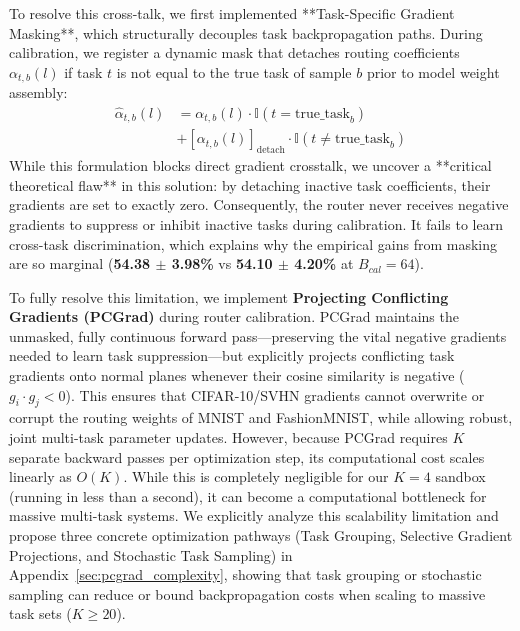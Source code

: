 To resolve this cross-talk, we first implemented **Task-Specific Gradient Masking**, which
structurally decouples task backpropagation paths. During calibration, we register a dynamic mask
that detaches routing coefficients $\alpha_{t, b}(l)$ if task $t$ is not equal to the true task of
sample $b$ prior to model weight assembly:
\begin{align}
\hat{\alpha}_{t, b}(l) &= \alpha_{t, b}(l) \cdot \mathbb{I}(t = \text{true\_task}_b) \nonumber \\
&+ \left[\alpha_{t, b}(l)\right]_{\text{detach}} \cdot \mathbb{I}(t \neq \text{true\_task}_b)
\label{eq:grad_mask_eq}
\end{align}
While this formulation blocks direct gradient crosstalk, we uncover a **critical theoretical flaw**
in this solution: by detaching inactive task coefficients, their gradients are set to exactly zero.
Consequently, the router never receives negative gradients to suppress or inhibit inactive tasks
during calibration. It fails to learn cross-task discrimination, which explains why the empirical
gains from masking are so marginal (\textbf{54.38 $\pm$ 3.98\%} vs \textbf{54.10 $\pm$ 4.20\%} at
$B_{cal}=64$).

To fully resolve this limitation, we implement \textbf{Projecting Conflicting Gradients (PCGrad)}
during router calibration. PCGrad maintains the unmasked, fully continuous forward pass---preserving
the vital negative gradients needed to learn task suppression---but explicitly projects conflicting
task gradients onto normal planes whenever their cosine similarity is negative ($g_i \cdot g_j <
0$). This ensures that CIFAR-10/SVHN gradients cannot overwrite or corrupt the routing weights of
MNIST and FashionMNIST, while allowing robust, joint multi-task parameter updates. However, because
PCGrad requires $K$ separate backward passes per optimization step, its computational cost scales
linearly as $O(K)$. While this is completely negligible for our $K=4$ sandbox (running in less than
a second), it can become a computational bottleneck for massive multi-task systems. We explicitly
analyze this scalability limitation and propose three concrete optimization pathways (Task Grouping,
Selective Gradient Projections, and Stochastic Task Sampling) in
Appendix~\ref{sec:pcgrad_complexity}, showing that task grouping or stochastic sampling can reduce
or bound backpropagation costs when scaling to massive task sets ($K \ge 20$).

